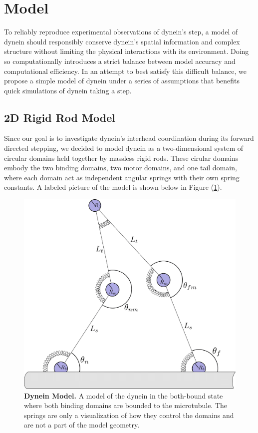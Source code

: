 \section{Model}
To reliably reproduce experimental observations of dynein's step, a model of dynein should responsibly conserve dynein's spatial information and complex structure without limiting the physical interactions with its environment. Doing so computationally introduces a strict balance between model accuracy and computational efficiency. In an attempt to best satisfy this difficult balance, we propose a simple model of dynein under a series of assumptions that benefits quick simulations of dynein taking a step. 


\subsection{2D Rigid Rod Model}
Since our goal is to investigate dynein's interhead coordination during its forward directed stepping, we decided to model dynein as a two-dimensional system of circular domains held together by massless rigid rods. These cirular domains embody the two binding domains, two motor domains, and one tail domain, where each domain act as independent angular springs with their own spring constants. A labeled picture of the model is shown below in Figure (\ref{fig:model}). 

\begin{figure}[H]
	\centering
	\includegraphics[width=0.6\columnwidth]{Figures/model-cartoon.png}
	\caption[Dynein Model]{\textbf{Dynein Model.} A model of the dynein in the both-bound state where both binding domains are bounded to the microtubule. The springs are only a visualization of how they control the domains and are not a part of the model geometry. \cite{Capek2017}}
	\label{fig:model}
\end{figure}

